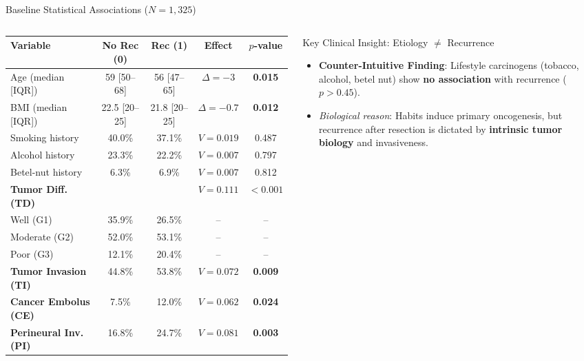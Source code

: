 \documentclass[10pt,aspectratio=169,xcolor={table,dvipsnames}]{beamer}
\begin{document}
\begin{frame}{Baseline Statistical Associations ($N=1,325$)}
  \begin{columns}[c]
      \centering
      \scriptsize
      \setlength{\tabcolsep}{3pt}
      \begin{tabular*}{\linewidth}{@{\extracolsep{\fill}}lcccc@{}}
        \toprule
        \textbf{Variable} & \textbf{No Rec (0)} & \textbf{Rec (1)} & \textbf{Effect} & \textbf{$p$-value} \\
        \midrule
        Age (median [IQR]) & 59 [50--68] & 56 [47--65] & $\Delta=-3$ & \textbf{0.015} \\
        BMI (median [IQR]) & 22.5 [20--25] & 21.8 [20--25] & $\Delta=-0.7$ & \textbf{0.012} \\
        \midrule
        Smoking history    & 40.0\% & 37.1\% & $V=0.019$ & 0.487 \\
        Alcohol history    & 23.3\% & 22.2\% & $V=0.007$ & 0.797 \\
        Betel-nut history  & 6.3\%  & 6.9\%  & $V=0.007$ & 0.812 \\
        \midrule
        \rowcolor{NavyBlue!10}
        \textbf{Tumor Diff. (TD)} & & & $V=0.111$ & \textbf{$<0.001$} \\
        \quad Well (G1)    & 35.9\% & 26.5\% & -- & -- \\
        \quad Moderate (G2)& 52.0\% & 53.1\% & -- & -- \\
        \quad Poor (G3)    & 12.1\% & 20.4\% & -- & -- \\
        \rowcolor{NavyBlue!10}
        \textbf{Tumor Invasion (TI)} & 44.8\% & 53.8\% & $V=0.072$ & \textbf{0.009} \\
        \rowcolor{NavyBlue!10}
        \textbf{Cancer Embolus (CE)} & 7.5\%  & 12.0\% & $V=0.062$ & \textbf{0.024} \\
        \rowcolor{NavyBlue!10}
        \textbf{Perineural Inv. (PI)}& 16.8\% & 24.7\% & $V=0.081$ & \textbf{0.003} \\
        \bottomrule
      \end{tabular*}

      \begin{block}{Key Clinical Insight: Etiology $\neq$ Recurrence}
        \begin{itemize}\setlength{\itemsep}{2pt}
          \item \textbf{Counter-Intuitive Finding}: Lifestyle carcinogens (tobacco, alcohol, betel nut) show \textbf{no association} with recurrence ($p > 0.45$).
          \item \textit{Biological reason}: Habits induce primary oncogenesis, but recurrence after resection is dictated by \textbf{intrinsic tumor biology} and invasiveness.
        \end{itemize}
      \end{block}


\end{columns}
\end{frame}
\end{document}
